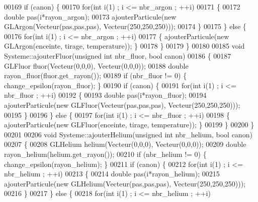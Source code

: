 \begin{DoxyCode}
00169     \textcolor{keywordflow}{if} (canon) \{
00170         \textcolor{keywordflow}{for}(\textcolor{keywordtype}{int} i(1) ; i <= nbr\_argon ; ++i)
00171         \{
00172             \textcolor{keywordtype}{double} pas(i*rayon\_argon);
00173             ajouterParticule(\textcolor{keyword}{new} GLArgon(Vecteur(pas,pas,pas), Vecteur(250,250,250)));
00174         \}
00175     \} \textcolor{keywordflow}{else} \{
00176         \textcolor{keywordflow}{for}(\textcolor{keywordtype}{int} i(1) ; i <= nbr\_argon ; ++i)
00177         \{ ajouterParticule(\textcolor{keyword}{new} GLArgon(enceinte, tirage, temperature)); \}
00178     \}
00179 \}
00180 
00185 \textcolor{keywordtype}{void} Systeme::ajouterFluor(\textcolor{keywordtype}{unsigned} \textcolor{keywordtype}{int} nbr\_fluor, \textcolor{keywordtype}{bool} canon)
00186 \{
00187     GLFluor fluor(Vecteur(0,0,0), Vecteur(0,0,0));
00188     \textcolor{keywordtype}{double} rayon\_fluor(fluor.get_rayon());
00189     \textcolor{keywordflow}{if} (nbr\_fluor != 0) \{ change\_epsilon(rayon\_fluor); \}
00190     \textcolor{keywordflow}{if} (canon) \{
00191         \textcolor{keywordflow}{for}(\textcolor{keywordtype}{int} i(1) ; i <= nbr\_fluor ; ++i)
00192         \{
00193             \textcolor{keywordtype}{double} pas(i*rayon\_fluor);
00194             ajouterParticule(\textcolor{keyword}{new} GLFluor(Vecteur(pas,pas,pas), Vecteur(250,250,250)));
00195         \}
00196     \} \textcolor{keywordflow}{else} \{
00197         \textcolor{keywordflow}{for}(\textcolor{keywordtype}{int} i(1) ; i <= nbr\_fluor ; ++i)
00198         \{ ajouterParticule(\textcolor{keyword}{new} GLFluor(enceinte, tirage, temperature)); \}
00199     \}
00200 \}
00201 
00206 \textcolor{keywordtype}{void} Systeme::ajouterHelium(\textcolor{keywordtype}{unsigned} \textcolor{keywordtype}{int} nbr\_helium, \textcolor{keywordtype}{bool} canon)
00207 \{
00208     GLHelium helium(Vecteur(0,0,0), Vecteur(0,0,0));
00209     \textcolor{keywordtype}{double} rayon\_helium(helium.get_rayon());
00210     \textcolor{keywordflow}{if} (nbr\_helium != 0) \{ change\_epsilon(rayon\_helium); \}
00211     \textcolor{keywordflow}{if} (canon) \{
00212         \textcolor{keywordflow}{for}(\textcolor{keywordtype}{int} i(1) ; i <= nbr\_helium ; ++i)
00213         \{
00214             \textcolor{keywordtype}{double} pas(i*rayon\_helium);
00215             ajouterParticule(\textcolor{keyword}{new} GLHelium(Vecteur(pas,pas,pas), Vecteur(250,250,250)));
00216         \}
00217     \} \textcolor{keywordflow}{else} \{
00218         \textcolor{keywordflow}{for}(\textcolor{keywordtype}{int} i(1) ; i <= nbr\_helium ; ++i)

\end{DoxyCode}
